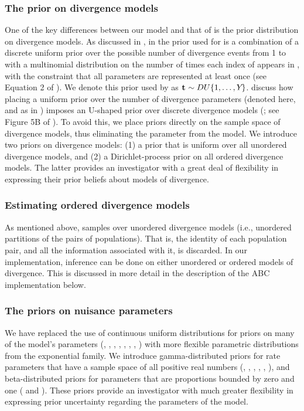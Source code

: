 \subsubsection*{The prior on divergence models}
One of the key differences between our model and that of \msb \citep{Huang2011}
is the prior distribution on divergence models.
As discussed in \citet{Oaks2012}, in \msb the prior used for
\divTimeIndexVector is a combination of a discrete uniform prior over the
possible number of divergence events \divTimeNum from 1 to \npairs{} with a
multinomial distribution on the number of times each index of \divTimeVector
appears in \divTimeIndexVector, with the constraint that all \divTime{}
parameters are represented at least once (see Equation 2 of \citet{Oaks2012}).
We denote this prior used by \msb as $\mathbf{t_{}} \sim DU\{1, \ldots, Y_{}\}$.
\citet{Oaks2012} discuss how placing a uniform prior over the number of
divergence parameters (denoted \divTimeNum here, and as \numt{} in
\citet{Huang2011}) imposes an U-shaped prior over discrete divergence
models (\divTimeIndexVector; see
Figure 5B of \citet{Oaks2012}).
To avoid this, we place priors directly on the sample space of divergence
models, thus eliminating the parameter \numt{} from the model.
We introduce two priors on divergence models:
(1) a prior that is uniform over all unordered divergence models, and
(2) a Dirichlet-process prior on all ordered divergence models.
The latter provides an investigator with a great deal of flexibility in
expressing their prior beliefs about models of divergence.

\subsubsection*{Estimating ordered divergence models}
As mentioned above, \msb samples over unordered divergence models
(i.e., unordered partitions of the \npairs{} pairs of populations).
That is, the identity of each population pair, and all the information
associated with it, is discarded.
In our implementation, inference can be done on either unordered or ordered
models of divergence.
This is discussed in more detail in the description of the ABC implementation
below.

\subsubsection*{The priors on nuisance parameters}
We have replaced the use of continuous uniform distributions for priors on many
of the model's parameters (\divTime{}, \ancestralTheta{},
, , ,
, \recombinationRate, \migrationRate{}) with more flexible
parametric distributions from the exponential family.
We introduce gamma-distributed priors for rate parameters that have a sample
space of all positive real numbers (\divTime{}, \ancestralTheta{},
, , \recombinationRate,
\migrationRate{}), and beta-distributed priors for parameters that are
proportions bounded by zero and one ( and
).
These priors provide an investigator with much greater flexibility in
expressing prior uncertainty regarding the parameters of the model.


